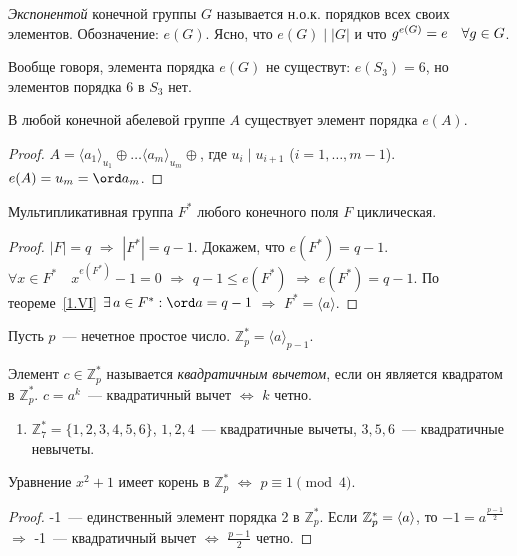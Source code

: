 \documentclass[a4paper]{article}
\newcommand*{\p}[1]{#1\nobreak\discretionary{}{\hbox{$\mathsurround=0pt #1$}}{}}
\begin{document}
\emph{Экспонентой} конечной группы $G$ называется н.о.к. порядков
всех своих элементов. Обозначение: $e(G)$. Ясно, что $e(G)\mid|G|$ и
что $g^{e(G)}\p=e\quad\forall g\in G$.

Вообще говоря, элемента порядка $e(G)$ не существут: $e(S_3)=6$, но
элементов порядка 6 в $S_3$ нет.

\begin{theorem}
\label{1.VI}В любой конечной абелевой группе $A$ существует элемент
порядка $e(A)$.
\end{theorem}

\begin{proof}
$A=\langle a_1\rangle_{u_1}\oplus\ldots\langle
a_m\rangle_{u_m}\oplus$, где $u_i\mid u_{i+1}$ ($i=1,\ldots,m-1$).
$e(A)=u_m=\ord a_m$.
\end{proof}

\begin{theorem}
Мультипликативная группа $F^*$ любого конечного поля $F$
циклическая.
\end{theorem}

\begin{proof}
$|F|=q$ $\Rightarrow$ $|F^*|=q-1$. Докажем, что $e(F^*)=q-1$.
$\forall x\in F^*\quad x^{e(F^*)}-1=0$ $\Rightarrow$ $q-1\leqslant
e(F^*)$ $\Rightarrow$ $e(F^*)=q-1$. По теореме~\ref{1.VI} $\exists
\, a\in F^*: \ord a=q-1$ $\Rightarrow$ $F^*=\langle a\rangle$.
\end{proof}

Пусть $p$~--- нечетное простое число. $\mathbb{Z}^*_p=\langle
a\rangle_{p-1}$.

Элемент $c\in\mathbb{Z}^*_{p}$ называется \emph{квадратичным
вычетом}, если он является квадратом в $\mathbb{Z}^*_p$. $c=a^k$~---
квадратичный вычет $\Leftrightarrow$ $k$ четно.

\begin{ex}
\begin{enumerate}
  \item $\mathbb{Z}^*_7=\{1,2,3,4,5,6\}$, $1,2,4$~--- квадратичные
  вычеты, $3, 5, 6$~--- квадратичные невычеты.
\end{enumerate}
\end{ex}

\begin{theorem}
Уравнение $x^2+1$ имеет корень в $\mathbb{Z}^*_p$ $\Leftrightarrow$
$p\equiv 1\pmod{4}$.
\end{theorem}

\begin{proof}
-1~--- единственный элемент порядка 2 в $\mathbb{Z}^*_p$. Если
$\mathbb{Z}^*_p\p=\langle a\rangle$, то $-1=a^{\frac{p-1}{2}}$
$\Rightarrow$ -1~--- квадратичный вычет $\Leftrightarrow$
$\frac{p-1}{2}$ четно.
\end{proof}
\end{document}
